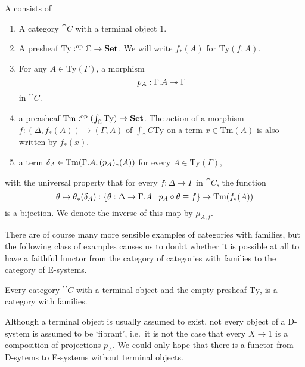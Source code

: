 \begin{defn}
A  consists of
\begin{enumerate}
\item A category $\cat{C}$ with a terminal object $1$.
\item A presheaf $\mathrm{Ty}:^{\mathrm{op}}{\mathbb{C}}\to\mathbf{Set}$. We will write
$f_\ast(A)$ for $\mathrm{Ty}(f,A)$.
\item For any $A\in\mathrm{Ty}(\Gamma)$, a morphism
\begin{equation*}
p_A : \ctxext{\Gamma}{A}\twoheadrightarrow \Gamma
\end{equation*}
in $\cat{C}$.
\item a preasheaf $\mathrm{Tm}:^{\mathrm{op}}{(\int_\mathbb{C}\mathrm{Ty})}\to\mathbf{Set}$.
The action of a morphism $f:(\Delta,f_\ast(A))\to(\Gamma,A)$ of $\int_\cat{C}\mathrm{Ty}$
on a term $x\in \mathrm{Tm}(A)$ is also written by $f_\ast(x)$.
\item a term $\delta_A\in\mathrm{Tm}(\ctxext{\Gamma}{A},(p_A)_\ast(A))$ for every
$A\in\mathrm{Ty}(\Gamma)$, 
\end{enumerate}
with the universal property that for every $f:\Delta\to\Gamma$ in $\cat{C}$, 
the function
\begin{equation*}
\theta\mapsto\theta_\ast(\delta_A)
  : \{\theta:\Delta\to\ctxext{\Gamma}{A}\mid p_A\circ\theta\jdeq f\}\to
    \mathrm{Tm}(f_\ast(A))
\end{equation*}
is a bijection. We denote the inverse of this map by $\mu_{A,f}$. 
\end{defn}

There are of course many more sensible examples of categories with families,
but the following class of examples causes us to doubt whether it is possible
at all to have a faithful functor from the category of categories
with families to the category of E-systems. 

\begin{eg}
Every category $\cat{C}$ with a terminal object and the empty presheaf 
$\mathrm{Ty}$, is a category with families.
\end{eg}

\begin{rmk}
Although a terminal object is usually assumed to exist, not every object 
of a D-system is assumed to be `fibrant', i.e.~it is
not the case that every $X\to 1$ is a composition of projections $p_A$.
We could only hope that there is a functor from D-sytems to E-systems without
terminal objects.
\end{rmk}

